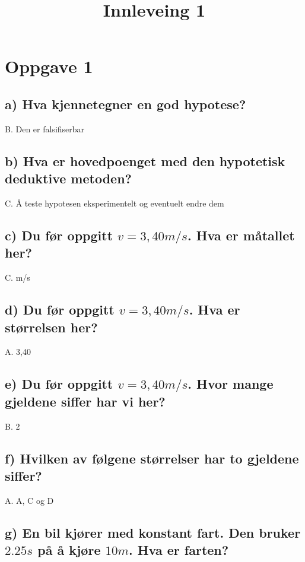 \documentclass{article}
\title{Innleveing 1}
\begin{document}
\maketitle

\section{Oppgave 1}

\subsection{a) Hva kjennetegner en god hypotese?}

B. Den er falsifiserbar

\subsection{b) Hva er hovedpoenget med den hypotetisk deduktive metoden?}

C. Å teste hypotesen eksperimentelt og eventuelt endre dem

\subsection{c) Du før oppgitt $v= 3,40 m/s$. Hva er måtallet her?}

C. m/s

\subsection{d) Du før oppgitt $v= 3,40 m/s$. Hva er størrelsen her?}

A. 3,40

\subsection{e) Du før oppgitt $v= 3,40 m/s$. Hvor mange gjeldene siffer har vi her?}

B. 2

\subsection{f) Hvilken av følgene størrelser har to gjeldene siffer?}

A. A, C og D

\subsection{g) En bil kjører med konstant fart. Den bruker $2.25s$ på å kjøre $10 m$. Hva er farten?}
\end{document}
